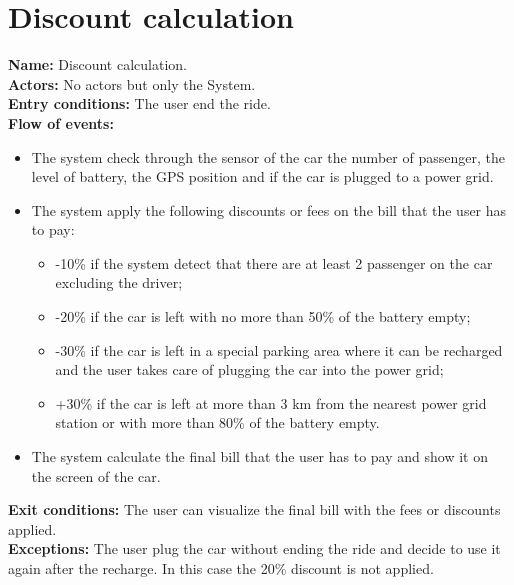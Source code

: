 \section*{Discount calculation}
\textbf{Name:} Discount calculation.\\
\textbf{Actors:} No actors but only the System.\\
\textbf{Entry conditions:} The user end the ride.\\
\textbf{Flow of events:}
\begin{itemize}
\item The system check through the sensor of the car the number of passenger, the level of battery, the GPS position and if the car is plugged to a power grid.
\item The system apply the following discounts or fees on the bill that the user has to pay:
\begin{itemize}
\item -10\% if the system detect that there are at least 2 passenger on the car excluding the driver;
\item -20\% if the car is left with no more than 50\% of the battery empty;
\item -30\% if the car is left in a special parking area where it can be recharged and the user takes care of plugging the car into the power grid;
\item +30\% if the car is left at more than 3 km from the nearest power grid station or with more than 80\% of the battery empty.
\end{itemize}
\item The system calculate the final bill that the user has to pay and show it on the screen of the car.
\end{itemize}
\textbf{Exit conditions:} The user can visualize the final bill with the fees or discounts applied.\\
\textbf{Exceptions:} The user plug the car without ending the ride and decide to use it again after the recharge. In this case the 20\% discount is not applied.

